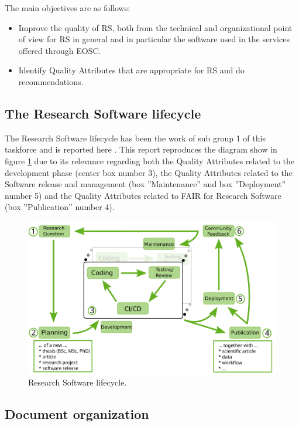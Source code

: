 The main objectives are as follows:

\begin{itemize}
    \item Improve the quality of RS, both from the technical and organizational point of view for RS in general and in particular the software used in the services offered through EOSC.
    \item Identify Quality Attributes that are appropriate for RS and do recommendations.
\end{itemize}

\subsection{The Research Software lifecycle}


The Research Software lifecycle has been the work of sub group 1 of this taskforce and is reported here \cite{sg1tf2023}. This report reproduces the diagram show in figure \ref{fig:rslifecycle} due to its relevance regarding both the Quality Attributes related to the development phase (center box number 3), the Quality Attributes related to the Software release and management (box ''Maintenance'' and box ''Deployment'' number 5) and the Quality Attributes related to FAIR for Research Software (box ''Publication'' number 4).

\begin{figure}[h]
    \centering
    \includegraphics[width=0.99\linewidth]{imgs/rs_lifecycle.png}
    \caption{Research Software lifecycle.}
    \label{fig:rslifecycle}
\end{figure}

\subsection{Document organization}

